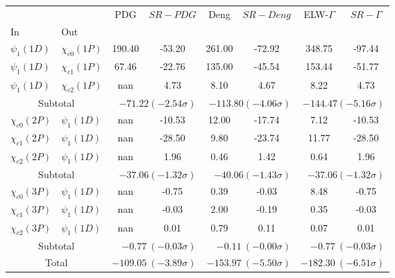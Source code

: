\begin{tabular}{|l|l|c|c|c|c|c|c|}%
\hline%
&&PDG&$SR-PDG$&Deng&$SR-Deng$&ELW-$\Gamma$&$SR-\Gamma$\\%
In&Out&&&&&&\\%
\hline%
$\psi_{1}(1D)$&$\chi_{c0}(1P)$&190.40&-53.20&261.00&-72.92&348.75&-97.44\\%
$\psi_{1}(1D)$&$\chi_{c1}(1P)$&67.46&-22.76&135.00&-45.54&153.44&-51.77\\%
$\psi_{1}(1D)$&$\chi_{c2}(1P)$&nan&4.73&8.10&4.67&8.22&4.73\\%
\hline%
\hline%
\multicolumn{2}{|c|}{Subtotal}&\multicolumn{2}{|r|}{$-71.22 (-2.54\sigma)$}&\multicolumn{2}{|r|}{$-113.80 (-4.06\sigma)$}&\multicolumn{2}{|r|}{$-144.47 (-5.16\sigma)$}\\%
\hline%
\hline%
$\chi_{c0}(2P)$&$\psi_{1}(1D)$&nan&-10.53&12.00&-17.74&7.12&-10.53\\%
$\chi_{c1}(2P)$&$\psi_{1}(1D)$&nan&-28.50&9.80&-23.74&11.77&-28.50\\%
$\chi_{c2}(2P)$&$\psi_{1}(1D)$&nan&1.96&0.46&1.42&0.64&1.96\\%
\hline%
\hline%
\multicolumn{2}{|c|}{Subtotal}&\multicolumn{2}{|r|}{$-37.06 (-1.32\sigma)$}&\multicolumn{2}{|r|}{$-40.06 (-1.43\sigma)$}&\multicolumn{2}{|r|}{$-37.06 (-1.32\sigma)$}\\%
\hline%
\hline%
$\chi_{c0}(3P)$&$\psi_{1}(1D)$&nan&-0.75&0.39&-0.03&8.48&-0.75\\%
$\chi_{c1}(3P)$&$\psi_{1}(1D)$&nan&-0.03&2.00&-0.19&0.35&-0.03\\%
$\chi_{c2}(3P)$&$\psi_{1}(1D)$&nan&0.01&0.79&0.11&0.07&0.01\\%
\hline%
\hline%
\multicolumn{2}{|c|}{Subtotal}&\multicolumn{2}{|r|}{$-0.77~(-0.03\sigma)$}&\multicolumn{2}{|r|}{$-0.11~(-0.00\sigma)$}&\multicolumn{2}{|r|}{$-0.77~(-0.03\sigma)$}\\%
\hline%
\hline%
\multicolumn{2}{|c|}{Total}&\multicolumn{2}{|r|}{$-109.05~(-3.89\sigma)$}&\multicolumn{2}{|r|}{$-153.97~(-5.50\sigma)$}&\multicolumn{2}{|r|}{$-182.30~(-6.51\sigma)$}\\%
\hline%
\end{tabular}